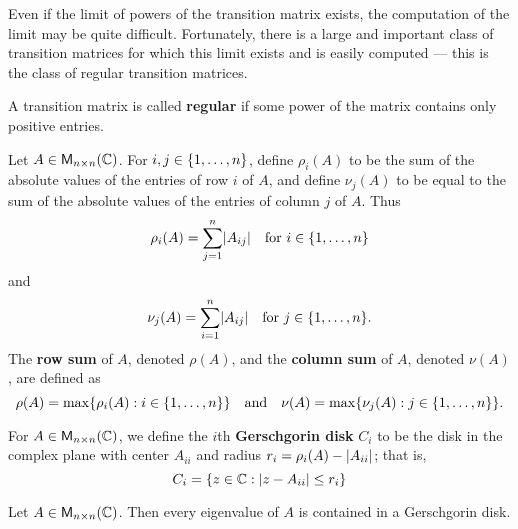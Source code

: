 \begin{note}
	Even if the limit of powers of the transition matrix exists, the computation of the limit may be quite difficult.
	Fortunately, there is a large and important class of transition matrices for which this limit exists and is easily computed
	--- this is the class of regular transition matrices.
\end{note}

\begin{defn}\label{5.3.7}
	A transition matrix is called \textbf{regular} if some power of the matrix contains only positive entries.
\end{defn}

\begin{defn}\label{5.3.8}
	Let \(A \in \ms[n][n][\C]\).
	For \(i, j \in \left\lbrace1, \dots, n\right\rbrace\), define \(\rho_i(A)\) to be the sum of the absolute values of the entries of row \(i\) of \(A\), and define \(\nu_j(A)\) to be equal to the sum of the absolute values of the entries of column \(j\) of \(A\).
	Thus
	\[
		\rho_i(A) = \sum_{j = 1}^n \abs{A_{i j}} \quad \text{for } i \in \set{1, \dots, n}
	\]
	and
	\[
		\nu_j(A) = \sum_{i = 1}^n \abs{A_{i j}} \quad \text{for } j \in \set{1, \dots, n}.
	\]
	The \textbf{row sum} of \(A\), denoted \(\rho(A)\), and the \textbf{column sum} of \(A\), denoted \(\nu(A)\), are defined as
	\[
		\rho(A) = \max\set{\rho_i(A) : i \in \set{1, \dots, n}} \quad \text{and} \quad \nu(A) = \max\set{\nu_j(A) : j \in \set{1, \dots, n}}.
	\]
\end{defn}

\begin{defn}\label{5.3.9}
	For \(A \in \ms[n][n][\C]\), we define the \(i\)th \textbf{Gerschgorin disk} \(C_i\) to be the disk in the complex plane with center \(A_{i i}\) and radius \(r_i = \rho_i(A) - \left\lvert A_{i i}\right\rvert\);
	that is,
	\[
		C_i = \left\lbrace z \in \mathbb{C} : \left\lvert z - A_{i i}\right\rvert \leq r_i\right\rbrace
	\]
\end{defn}

\begin{thm}\label{5.16}
	Let \(A \in \ms[n][n][\C]\).
	Then every eigenvalue of \(A\) is contained in a Gerschgorin disk.
\end{thm}

